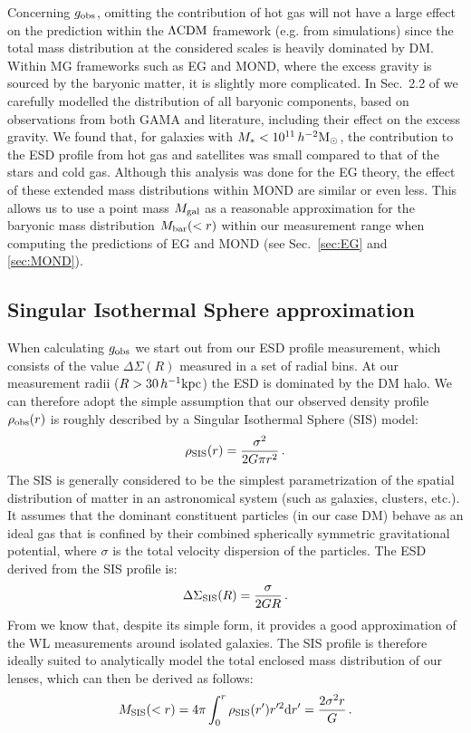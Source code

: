 \documentclass[usenatbib]{mnras}
\newcommand{\hmsun}{\,h^{-2} {\rm M_\odot}}
\newcommand{\hkpc}{\, h^{-1}{\rm{kpc}} }
\newcommand{\lcdm}{{\rm \Lambda CDM}}
\newcommand{\un}[1]{_{\rm #1}}
\begin{document}
Concerning $g\un{obs}$, omitting the contribution of hot gas will not have a large effect on the prediction within the $\lcdm$ framework (e.g. from simulations) since the total mass distribution at the considered scales is heavily dominated by DM. Within MG frameworks such as EG and MOND, where the excess gravity is sourced by the baryonic matter, it is slightly more complicated. In Sec.~2.2 of \cite{brouwer2017} we carefully modelled the distribution of all baryonic components, based on observations from both GAMA and literature, including their effect on the excess gravity. We found that, for galaxies with $M_*<10^{11}\hmsun$, the contribution to the ESD profile from hot gas and satellites was small compared to that of the stars and cold gas. Although this analysis was done for the EG theory, the effect of these extended mass distributions within MOND are similar or even less. This allows us to use a point mass $M\un{gal}$ as a reasonable approximation for the baryonic mass distribution $M\un{bar}(<r)$ within our measurement range when computing the predictions of EG and MOND (see Sec.~\ref{sec:EG} and \ref{sec:MOND}).

\subsection{Singular Isothermal Sphere approximation}
\label{sec:SIS_approximation}

When calculating $g\un{obs}$ we start out from our ESD profile measurement, which consists of the value $\Delta\Sigma(R)$ measured in a set of radial bins. At our measurement radii ($R>30\hkpc$) the ESD is dominated by the DM halo. We can therefore adopt the simple assumption that our observed density profile $\rho\un{obs}(r)$ is roughly described by a Singular Isothermal Sphere (SIS) model:
\begin{equation}\label{eq:rho_SIS}
	\rho\un{SIS}(r) = \frac{\sigma^2}{2 G \pi r^2} \, . 
\end{equation}
The SIS is generally considered to be the simplest parametrization of the spatial distribution of matter in an astronomical system (such as galaxies, clusters, etc.). It assumes that the dominant constituent particles (in our case DM) behave as an ideal gas that is confined by their combined spherically symmetric gravitational potential, where $\sigma$ is the total velocity dispersion of the particles. The ESD derived from the SIS profile is:
\begin{equation}\label{eq:ESD_SIS}
\Delta\Sigma\un{SIS}(R) = \frac{\sigma}{2 G R} \, .
\end{equation}
From \cite{brouwer2017} we know that, despite its simple form, it provides a good approximation of the WL measurements around isolated galaxies. The SIS profile is therefore ideally suited to analytically model the total enclosed mass distribution of our lenses, which can then be derived as follows:
\begin{equation}\label{eq:mass_SIS}
	M\un{SIS}(<r) = 4 \pi \int_{0}^{r}\rho\un{SIS}(r') r'^2 {\rm d} r' = \frac{2\sigma^2 r}{G} \, .
\end{equation}
\end{document}
